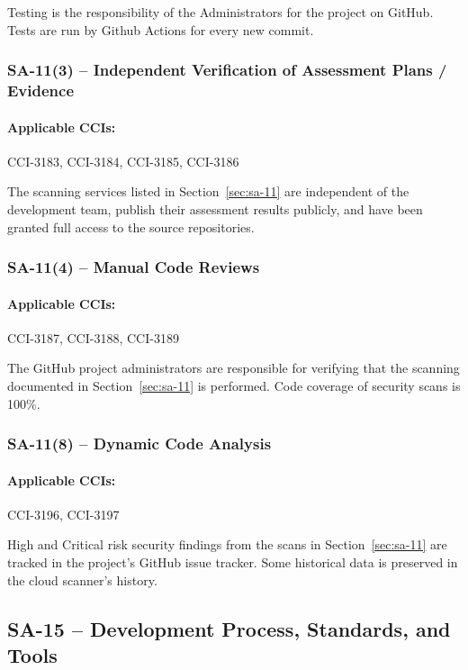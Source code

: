 \documentclass[letterpaper, 10pt, twoside]{article}
\begin{document}
Testing is the responsibility of the Administrators for the project on GitHub. Tests are run by Github Actions for every new commit.

\subsubsection{SA-11(3) -- Independent Verification of Assessment Plans / Evidence}

\paragraph{Applicable CCIs:} CCI-3183, CCI-3184, CCI-3185, CCI-3186

The scanning services listed in Section~\ref{sec:sa-11} are independent of the development team, publish their assessment results publicly, and have been granted full access to the source repositories.

\subsubsection{SA-11(4) -- Manual Code Reviews}

\paragraph{Applicable CCIs:} CCI-3187, CCI-3188, CCI-3189

The GitHub project administrators are responsible for verifying that the scanning documented in Section~\ref{sec:sa-11} is performed. Code coverage of security scans is 100\%.

\subsubsection{SA-11(8) -- Dynamic Code Analysis}

\paragraph{Applicable CCIs:} CCI-3196, CCI-3197

High and Critical risk security findings from the scans in Section~\ref{sec:sa-11} are tracked in the project's GitHub issue tracker. Some historical data is preserved in the cloud scanner's history.

\subsection{SA-15 -- Development Process, Standards, and Tools}
\end{document}
